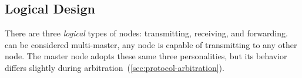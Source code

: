 \subsection{Logical Design}
\label{sec:logical}

There are three {\em logical} types of \bus nodes: transmitting, receiving,
and forwarding. \bus can be considered multi-master, any node is capable of
transmitting to any other node. The master node adopts these same three
personalities, but its behavior differs slightly during
arbitration~(\ref{sec:protocol-arbitration}).

